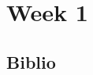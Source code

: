 \documentclass[11pt]{book}
\begin{document}
    
    \tableofcontents
    \chapter{Week 1}
    

    \newpage
    \section*{Biblio}
    
    
    \printindex
\end{document}
